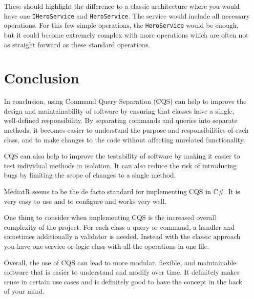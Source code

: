 \documentclass[11pt,conference]{IEEEtran}
\begin{document}
These should highlight the difference to a classic architecture where you would have one \texttt{IHeroService} and \texttt{HeroService}.
The service would include all necessary operations.
For this few simple operations, the \texttt{HeroService} would be enough, but it could become extremely complex with more operations which are often not as straight forward as these standard operations.

\section{Conclusion}

In conclusion, using Command Query Separation (CQS) can help to improve the design and maintainability of software by ensuring that classes have a single, well-defined responsibility. By separating commands and queries into separate methods, it becomes easier to understand the purpose and responsibilities of each class, and to make changes to the code without affecting unrelated functionality.

CQS can also help to improve the testability of software by making it easier to test individual methods in isolation. It can also reduce the risk of introducing bugs by limiting the scope of changes to a single method.

MediatR seems to be the de facto standard for implementing CQS in C\#.
It is very easy to use and to configure and works very well.

One thing to consider when implementing CQS is the increased overall complexity of the project.
For each class a query or command, a handler and sometimes additionally a validator is needed.
Instead with the classic approach you have one service or logic class with all the operations in one file.

Overall, the use of CQS can lead to more modular, flexible, and maintainable software that is easier to understand and modify over time.
It definitely makes sense in certain use cases and is definitely good to have the concept in the back of your mind.

\printbibliography
\end{document}
